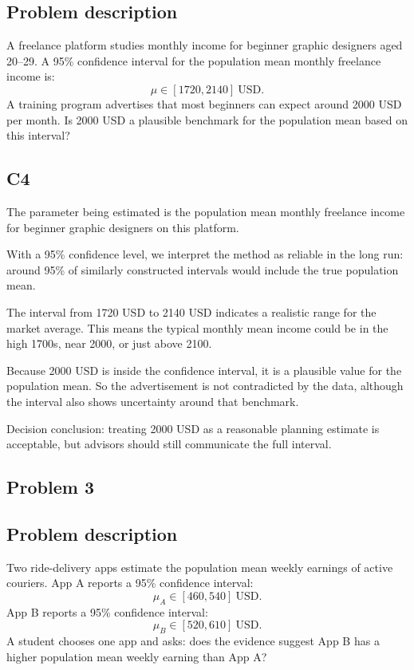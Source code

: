 \begin{ExamProblems}
		\subsection*{Problem description}
		A freelance platform studies monthly income for beginner graphic designers aged 20--29.
		A 95\% confidence interval for the population mean monthly freelance income is:
		\[
		\mu \in [1720, 2140]\ \text{USD}.
		\]
		A training program advertises that most beginners can expect around 2000 USD per month.
		Is 2000 USD a plausible benchmark for the population mean based on this interval?

		\subsection*{C4}
		The parameter being estimated is the population mean monthly freelance income for beginner graphic designers on this platform.

		With a 95\% confidence level, we interpret the method as reliable in the long run: around 95\% of similarly constructed intervals would include the true population mean.

		The interval from 1720 USD to 2140 USD indicates a realistic range for the market average.
		This means the typical monthly mean income could be in the high 1700s, near 2000, or just above 2100.

		Because 2000 USD is inside the confidence interval, it is a plausible value for the population mean.
		So the advertisement is not contradicted by the data, although the interval also shows uncertainty around that benchmark.

		Decision conclusion: treating 2000 USD as a reasonable planning estimate is acceptable, but advisors should still communicate the full interval.

		\newpage
		\item
		\subsection*{Problem 3}
		\subsection*{Problem description}
		Two ride-delivery apps estimate the population mean weekly earnings of active couriers.
		App A reports a 95\% confidence interval:
		\[
		\mu_A \in [460, 540]\ \text{USD}.
		\]
		App B reports a 95\% confidence interval:
		\[
		\mu_B \in [520, 610]\ \text{USD}.
		\]
		A student chooses one app and asks: does the evidence suggest App B has a higher population mean weekly earning than App A?


\end{ExamProblems}
